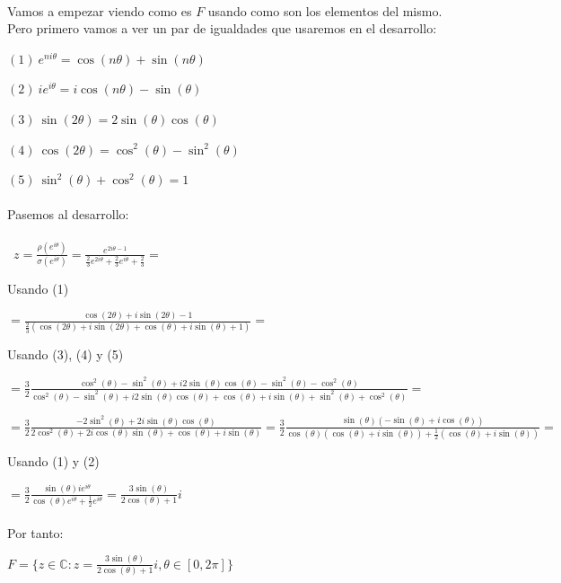 \documentclass[a4paper,11pt,spanish,leqno]{article}
\begin{document}
\paragraph{}Vamos a empezar viendo como es $F$ usando como son los elementos del mismo. Pero primero vamos a ver un par de igualdades que usaremos en el desarrollo:

$(1)\ e^{ni\theta} = \cos(n\theta) +  \sin(n\theta)$

$(2)\ ie^{i\theta} = i\cos(n\theta) - \sin(\theta)$

$(3)\ \sin(2\theta) = 2\sin(\theta)\cos(\theta)$

$(4)\ \cos(2\theta) = \cos^2(\theta) - \sin^2(\theta)$

$(5)\ \sin^2(\theta) + \cos^2(\theta) = 1$
\\\\
Pasemos al desarrollo:
\\\\\
$z = \frac{\rho(e^{i\theta})}{\sigma(e^{i\theta})} = \frac{e^{2i\theta - 1}}{\frac{2}{3}e^{2i\theta} + \frac{2}{3}e^{i\theta} + \frac{2}{3}} = $

Usando (1)  

$ = \frac{\cos(2\theta) + i\sin(2\theta) - 1}{\frac{2}{3}(\cos(2\theta) + i\sin(2\theta) + \cos(\theta) + i\sin(\theta) + 1)} =$

Usando (3), (4) y (5)

$ = \frac{3}{2}\frac{\cos^2(\theta) - \sin^2(\theta) + i2\sin(\theta)\cos(\theta) - \sin^2(\theta) - \cos^2(\theta)}{\cos^2(\theta) - \sin^2(\theta) + i2\sin(\theta)\cos(\theta) + \cos(\theta) + i\sin(\theta) + \sin^2(\theta) + \cos^2(\theta)} = $

$ = \frac{3}{2} \frac{-2\sin^2(\theta) + 2i\sin(\theta)\cos(\theta)}{2\cos^2(\theta) + 2i\cos(\theta)\sin(\theta) + \cos(\theta) + i\sin(\theta)} = \frac{3}{2}\frac{\sin(\theta)(-\sin(\theta) + i\cos(\theta))}{\cos(\theta)(\cos(\theta) + i\sin(\theta)) +\frac{1}{2}(\cos(\theta) + i\sin(\theta))} =$

Usando (1) y (2)

$ = \frac{3}{2}\frac{\sin(\theta)ie^{i\theta}}{\cos(\theta)e^{i\theta} + \frac{1}{2}e^{i\theta}} = \frac{3\sin(\theta)}{2\cos(\theta) + 1}i$

\paragraph{}Por tanto:

$F = \{z \in \mathbb{C}: z = \frac{3\sin(\theta)}{2\cos(\theta) + 1}i , \theta \in [0,2\pi] \}$
\end{document}
